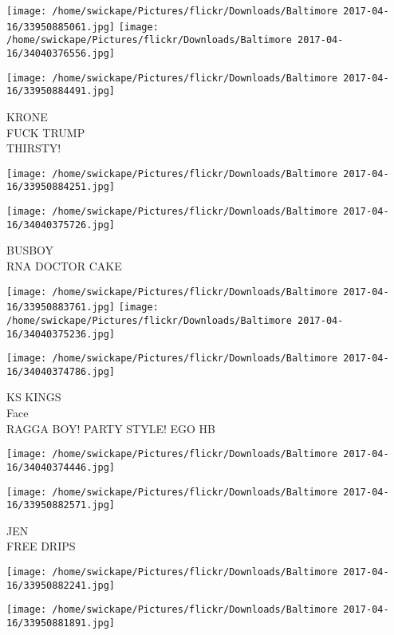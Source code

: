 \documentclass[10pt,letterpaper]{article}
\begin{document}
\texttt{[image: /home/swickape/Pictures/flickr/Downloads/Baltimore 2017-04-16/33950885061.jpg]}
\texttt{[image: /home/swickape/Pictures/flickr/Downloads/Baltimore 2017-04-16/34040376556.jpg]}

\vspace{0.25in}
\texttt{[image: /home/swickape/Pictures/flickr/Downloads/Baltimore 2017-04-16/33950884491.jpg]}

KRONE\\
FUCK TRUMP\\
THIRSTY!\\
\pagebreak

\texttt{[image: /home/swickape/Pictures/flickr/Downloads/Baltimore 2017-04-16/33950884251.jpg]}

\vspace{0.25in}
\texttt{[image: /home/swickape/Pictures/flickr/Downloads/Baltimore 2017-04-16/34040375726.jpg]}

BUSBOY\\
RNA DOCTOR CAKE\\
\pagebreak

\texttt{[image: /home/swickape/Pictures/flickr/Downloads/Baltimore 2017-04-16/33950883761.jpg]}
\texttt{[image: /home/swickape/Pictures/flickr/Downloads/Baltimore 2017-04-16/34040375236.jpg]}

\vspace{0.25in}
\texttt{[image: /home/swickape/Pictures/flickr/Downloads/Baltimore 2017-04-16/34040374786.jpg]}

KS KINGS\\
Face\\
RAGGA BOY!  PARTY STYLE!  EGO HB\\
\pagebreak

\texttt{[image: /home/swickape/Pictures/flickr/Downloads/Baltimore 2017-04-16/34040374446.jpg]}

\vspace{0.25in}
\texttt{[image: /home/swickape/Pictures/flickr/Downloads/Baltimore 2017-04-16/33950882571.jpg]}

JEN\\
FREE DRIPS\\
\pagebreak

\texttt{[image: /home/swickape/Pictures/flickr/Downloads/Baltimore 2017-04-16/33950882241.jpg]}

\vspace{0.25in}
\texttt{[image: /home/swickape/Pictures/flickr/Downloads/Baltimore 2017-04-16/33950881891.jpg]}
\end{document}
